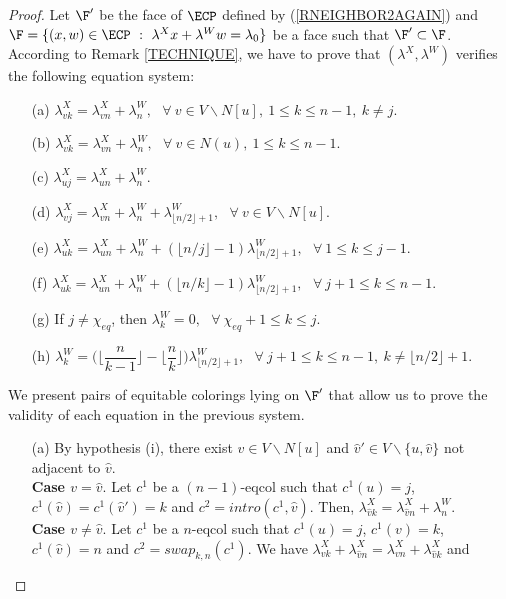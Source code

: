 \begin{proof}
Let $\F'$ be the face of $\ECP$ defined by (\ref{RNEIGHBOR2AGAIN}) and
$\F = \{ (x,w) \in \ECP ~:~ \lambda^X x + \lambda^W w = \lambda_0\}$ be a face such that $\F' \subset \F$.
According to Remark \ref{TECHNIQUE}, we have to prove that $(\lambda^X, \lambda^W)$ verifies the following equation system: 
\begin{enumerate}
\item[(a)] $\lambda^X_{vk} = \lambda^X_{vn} + \lambda^W_n,
                           ~~~\forall~v \in V \backslash N[u],~ 1 \leq k \leq n - 1,~ k \neq j$.
\item[(b)] $\lambda^X_{vk} = \lambda^X_{vn} + \lambda^W_n,
                           ~~~\forall~v \in N(u),~ 1 \leq k \leq n - 1$.
\item[(c)] $\lambda^X_{uj} = \lambda^X_{un} + \lambda^W_n$.
\item[(d)] $\lambda^X_{vj} = \lambda^X_{vn} + \lambda^W_n +
\lambda^W_{\lfloor n/2 \rfloor + 1},~~~\forall~v \in V \backslash N[u]$.
\item[(e)] $\lambda^X_{uk} = \lambda^X_{un} + \lambda^W_n +
(\lfloor n/j \rfloor - 1)\lambda^W_{\lfloor n/2 \rfloor + 1},~~~\forall~1 \leq k \leq j - 1$.
\item[(f)] $\lambda^X_{uk} = \lambda^X_{un} + \lambda^W_n +
(\lfloor n/k \rfloor - 1)\lambda^W_{\lfloor n/2 \rfloor + 1},~~~\forall~j + 1 \leq k \leq n - 1$.
\item[(g)] If $j \neq \chi_{eq}$, then $\lambda^W_k = 0,~~~\forall~\chi_{eq} + 1 \leq k \leq j$.
\item[(h)] $\lambda^W_k = \biggl(\biggl\lfloor \dfrac{n}{k-1} \biggr\rfloor - \biggl\lfloor \dfrac{n}{k} \biggr\rfloor \biggr)
\lambda^W_{\lfloor n/2 \rfloor + 1},~~~\forall~ j + 1 \leq k \leq n - 1,~ k \neq \lfloor n/2 \rfloor+1$.
\end{enumerate}
We present pairs of equitable colorings lying on $\F'$ that allow us to
prove the validity of each equation in the previous system.
\begin{enumerate}
\item[(a)] By hypothesis (i), there exist $\hat{v} \in V \backslash N[u]$ and $\hat{v}' \in V \backslash \{u, \hat{v}\}$ not adjacent to $\hat{v}$.\\
\textbf{Case $v = \hat{v}$}. Let $c^1$ be a $(n-1)$-eqcol such that
$c^1(u) = j$, $c^1(\hat{v}) = c^1(\hat{v}') = k$ and $c^2 = intro(c^1,\hat{v})$.
Then, $\lambda^X_{\hat{v} k} = \lambda^X_{\hat{v} n} + \lambda^W_n$.\\
\textbf{Case $v \neq \hat{v}$}. Let $c^1$ be a $n$-eqcol such that $c^1(u) = j$, $c^1(v) = k$, $c^1(\hat{v}) = n$ and $c^2 = swap_{k,n}(c^1)$. We have $\lambda^X_{vk} + \lambda^X_{\hat{v} n} = \lambda^X_{vn} + \lambda^X_{\hat{v} k}$ and

\end{enumerate}
\end{proof}
